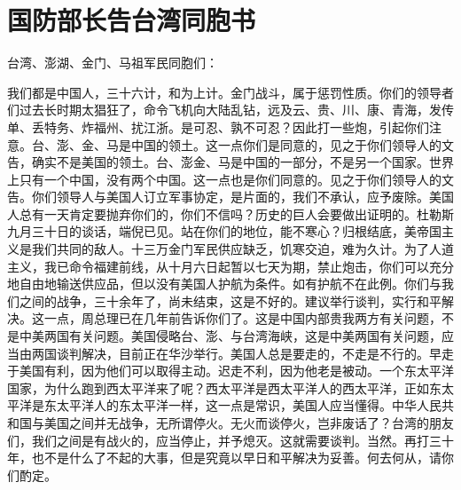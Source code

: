 \section[国防部长告台湾同胞书（一九五八年十月六日）]{国防部长告台湾同胞书}


台湾、澎湖、金门、马祖军民同胞们：

我们都是中国人，三十六计，和为上计。金门战斗，属于惩罚性质。你们的领导者们过去长时期太猖狂了，命令飞机向大陆乱钻，远及云、贵、川、康、青海，发传单、丢特务、炸福州、扰江浙。是可忍、孰不可忍？因此打一些炮，引起你们注意。台、澎、金、马是中国的领土。这一点你们是同意的，见之于你们领导人的文告，确实不是美国的领土。台、澎金、马是中国的一部分，不是另一个国家。世界上只有一个中国，没有两个中国。这一点也是你们同意的。见之于你们领导人的文告。你们领导人与美国人订立军事协定，是片面的，我们不承认，应予废除。美国人总有一天肯定要抛弃你们的，你们不信吗？历史的巨人会要做出证明的。杜勒斯九月三十日的谈话，端倪已见。站在你们的地位，能不寒心？归根结底，美帝国主义是我们共同的敌人。十三万金门军民供应缺乏，饥寒交迫，难为久计。为了人道主义，我已命令福建前线，从十月六日起暂以七天为期，禁止炮击，你们可以充分地自由地输送供应品，但以没有美国人护航为条件。如有护航不在此例。你们与我们之间的战争，三十余年了，尚未结束，这是不好的。建议举行谈判，实行和平解决。这一点，周总理已在几年前告诉你们了。这是中国内部贵我两方有关问题，不是中美两国有关问题。美国侵略台、澎、与台湾海峡，这是中美两国有关问题，应当由两国谈判解决，目前正在华沙举行。美国人总是要走的，不走是不行的。早走于美国有利，因为他们可以取得主动。迟走不利，因为他老是被动。一个东太平洋国家，为什么跑到西太平洋来了呢？西太平洋是西太平洋人的西太平洋，正如东太平洋是东太平洋人的东太平洋一样，这一点是常识，美国人应当懂得。中华人民共和国与美国之间并无战争，无所谓停火。无火而谈停火，岂非废话了？台湾的朋友们，我们之间是有战火的，应当停止，并予熄灭。这就需要谈判。当然。再打三十年，也不是什么了不起的大事，但是究竟以早日和平解决为妥善。何去何从，请你们酌定。


